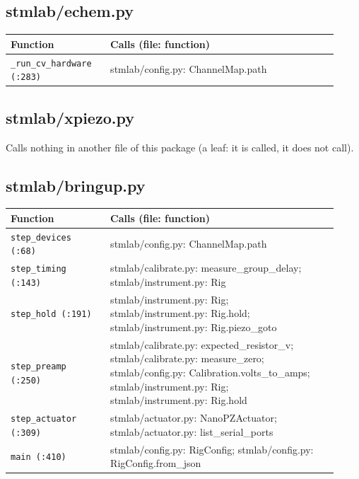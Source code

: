 \subsection{stmlab/echem.py}

\small\setlength{\LTleft}{0pt}\setlength{\LTright}{\fill}
\begin{longtable}{@{}>{\raggedright\arraybackslash}p{0.280\linewidth}>{\raggedright\arraybackslash}p{0.640\linewidth}@{}}
\toprule
\textbf{Function} & \textbf{Calls (file: function)} \\
\midrule\endhead
\texttt{\_\discretionary{}{}{}run\_\discretionary{}{}{}cv\_\discretionary{}{}{}hardware (:283)} & stmlab/config.py: ChannelMap.path \\
\bottomrule
\end{longtable}
\normalsize

\subsection{stmlab/xpiezo.py}

Calls nothing in another file of this package (a leaf: it is called, it does not call).

\subsection{stmlab/bringup.py}

\small\setlength{\LTleft}{0pt}\setlength{\LTright}{\fill}
\begin{longtable}{@{}>{\raggedright\arraybackslash}p{0.280\linewidth}>{\raggedright\arraybackslash}p{0.640\linewidth}@{}}
\toprule
\textbf{Function} & \textbf{Calls (file: function)} \\
\midrule\endhead
\texttt{step\_\discretionary{}{}{}devices (:68)} & stmlab/config.py: ChannelMap.path \\
\texttt{step\_\discretionary{}{}{}timing (:143)} & stmlab/calibrate.py: measure\_group\_delay; stmlab/instrument.py: Rig \\
\texttt{step\_\discretionary{}{}{}hold (:191)} & stmlab/instrument.py: Rig; stmlab/instrument.py: Rig.hold; stmlab/instrument.py: Rig.piezo\_goto \\
\texttt{step\_\discretionary{}{}{}preamp (:250)} & stmlab/calibrate.py: expected\_resistor\_v; stmlab/calibrate.py: measure\_zero; stmlab/config.py: Calibration.volts\_to\_amps; stmlab/instrument.py: Rig; stmlab/instrument.py: Rig.hold \\
\texttt{step\_\discretionary{}{}{}actuator (:309)} & stmlab/actuator.py: NanoPZActuator; stmlab/actuator.py: list\_serial\_ports \\
\texttt{main (:410)} & stmlab/config.py: RigConfig; stmlab/config.py: RigConfig.from\_json \\
\bottomrule
\end{longtable}
\normalsize

